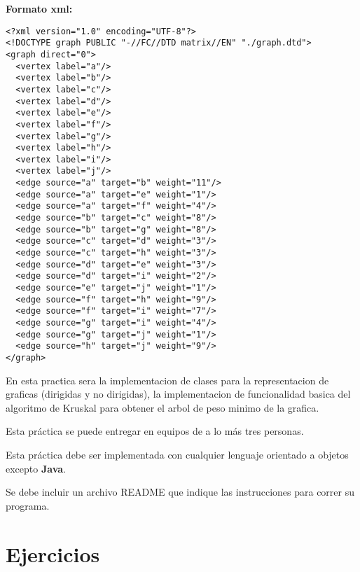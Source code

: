 \documentclass{article}
\begin{document}
\textbf{Formato xml:}
\begin{verbatim}
<?xml version="1.0" encoding="UTF-8"?>
<!DOCTYPE graph PUBLIC "-//FC//DTD matrix//EN" "./graph.dtd">
<graph direct="0">
  <vertex label="a"/>
  <vertex label="b"/>	
  <vertex label="c"/>
  <vertex label="d"/>
  <vertex label="e"/>
  <vertex label="f"/>
  <vertex label="g"/>
  <vertex label="h"/>
  <vertex label="i"/>
  <vertex label="j"/>
  <edge source="a" target="b" weight="11"/>
  <edge source="a" target="e" weight="1"/>
  <edge source="a" target="f" weight="4"/>
  <edge source="b" target="c" weight="8"/>
  <edge source="b" target="g" weight="8"/>
  <edge source="c" target="d" weight="3"/>
  <edge source="c" target="h" weight="3"/>
  <edge source="d" target="e" weight="3"/>
  <edge source="d" target="i" weight="2"/>
  <edge source="e" target="j" weight="1"/>
  <edge source="f" target="h" weight="9"/>
  <edge source="f" target="i" weight="7"/>
  <edge source="g" target="i" weight="4"/>
  <edge source="g" target="j" weight="1"/>
  <edge source="h" target="j" weight="9"/>
</graph>
\end{verbatim}

En esta practica sera la implementacion de clases para la representacion de graficas (dirigidas y no dirigidas), la implementacion de funcionalidad basica del algoritmo de Kruskal para obtener el arbol de peso minimo de la grafica. 

Esta práctica se puede entregar en equipos de a lo más tres personas.

Esta práctica debe ser implementada con cualquier lenguaje orientado a objetos excepto \textbf{Java}.

Se debe incluir un archivo README que indique las instrucciones para correr su programa.

\section{Ejercicios}
\end{document}
